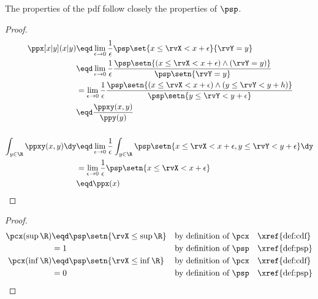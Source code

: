 The properties of the pdf follow closely the properties of  $\psp$.
\begin{theorem}
\end{theorem}
\begin{proof}
\begin{align*}
  \ppx[x|y](x|y)
    &\eqd \lim_{\epsilon\to0} \frac{1}{\epsilon} \psp\set{x\le\rvX < x+\epsilon}{\rvY=y}
  \\&\eqd \lim_{\epsilon\to0} \frac{1}{\epsilon} \frac{\psp\setn{(x\le\rvX < x+\epsilon) \land (\rvY=y)}}
                                                      {\psp\setn{\rvY=y}}
  \\&=    \lim_{\epsilon\to0} \frac{1}{\epsilon} \frac{\psp\setn{(x\le\rvX < x+\epsilon) \land (y\le\rvY<y+h)}}
                                                      {\psp\setn{y\le\rvY<y+\epsilon}}
  \\&\eqd \frac{\ppxy(x,y)}{\ppy(y)}
\\
\\
  \int_{y\in\R}\ppxy(x,y)\dy
    &\eqd \lim_{\epsilon\to0} \frac{1}{\epsilon}
          \int_{y\in\R} \psp\setn{x\le\rvX<x+\epsilon, y\le\rvY<y+\epsilon} \dy
  \\&=    \lim_{\epsilon\to0} \frac{1}{\epsilon} \psp\setn{x\le\rvX<x+\epsilon}
  \\&\eqd \ppx(x)
\end{align*}
\end{proof}

\begin{theorem}
\label{thm:cdf}
\end{theorem}
\begin{proof}
\begin{align*}
  \pcx(\sup\R)
    &\eqd \psp\setn{\rvX\le\sup\R} && \text{by definition of $\pcx$} &&\text{\xref{def:cdf}}
  \\&=    1                  && \text{by definition of $\psp$} &&\text{\xref{def:psp}}
  \\
  \pcx(\inf\R)
    &\eqd \psp\setn{\rvX\le\inf\R} && \text{by definition of $\pcx$} &&\text{\xref{def:cdf}}
  \\&=    0                  && \text{by definition of $\psp$} &&\text{\xref{def:psp}}
\end{align*}
\end{proof}

